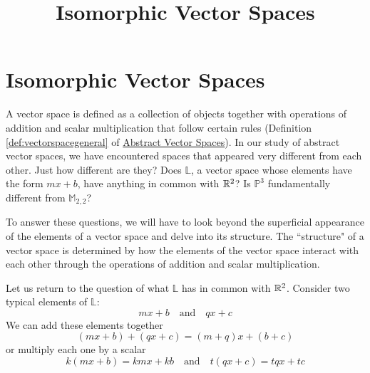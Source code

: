 \documentclass{ximera}
\title{Isomorphic Vector Spaces} \license{CC BY-NC-SA 4.0}
\begin{document}
\begin{abstract}
\end{abstract}
\maketitle

\section*{Isomorphic Vector Spaces}

A vector space is defined as a collection of objects together with operations of addition and scalar multiplication that follow certain rules (Definition \ref{def:vectorspacegeneral} of \href{https://ximera.osu.edu/oerlinalg/LinearAlgebra/VSP-0050/main}{Abstract Vector Spaces}).  In our study of abstract vector spaces, we have encountered spaces that appeared very different from each other.  Just how different are they?  Does $\mathbb{L}$, a vector space whose elements have the form $mx+b$, have anything in common with $\mathbb{R}^2$?  Is $\mathbb{P}^3$ fundamentally different from $\mathbb{M}_{2,2}$?

To answer these questions, we will have to look beyond the superficial appearance of the elements of a vector space and delve into its structure.  The ``structure" of a vector space is determined by how the elements of the vector space interact with each other through the operations of addition and scalar multiplication.  

Let us return to the question of what $\mathbb{L}$ has in common with $\mathbb{R}^2$.  Consider two typical elements of $\mathbb{L}$:
\begin{equation}\label{eq:iso1}
    mx+b\quad\text{and}\quad qx+c
\end{equation}
We can add these elements together
\begin{equation}\label{eq:iso2}
(mx+b)+(qx+c)=(m+q)x+(b+c)\end{equation}
or multiply each one by a scalar
\begin{equation}\label{eq:iso3}
k(mx+b)=kmx+kb\quad\text{and}\quad t(qx+c)=tqx+tc\end{equation}
\end{document}
